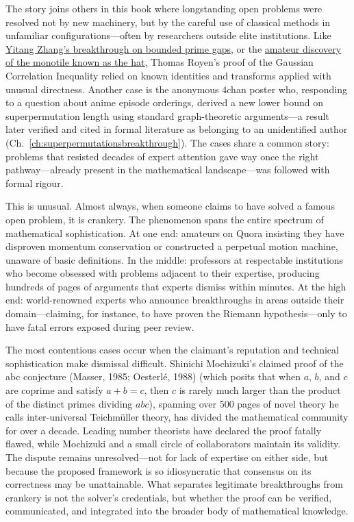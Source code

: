 \begin{commentary}
The story joins others in this book where longstanding open problems were resolved not by new machinery, but by the careful use of classical methods in unfamiliar configurations—often by researchers outside elite institutions. Like \hyperref[ch:boundedprimegaps]{Yitang Zhang's breakthrough on bounded prime gaps}, or the \hyperref[ch:hatmonotile]{amateur discovery of the monotile known as the \QSOpen{}hat,\QSClose{}} Thomas Royen's proof of the Gaussian Correlation Inequality relied on known identities and transforms applied with unusual directness. Another case is the anonymous 4chan poster who, responding to a question about anime episode orderings, derived a new lower bound on superpermutation length using standard graph-theoretic arguments—a result later verified and cited in formal literature as belonging to an unidentified author (Ch.~\ref{ch:superpermutationsbreakthrough}). The cases share a common story: problems that resisted decades of expert attention gave way once the right pathway—already present in the mathematical landscape—was followed with formal rigour.

This is unusual. Almost always, when someone claims to have solved a famous open problem, it is crankery. The phenomenon spans the entire spectrum of mathematical sophistication. At one end: amateurs on Quora insisting they have disproven momentum conservation or constructed a perpetual motion machine, unaware of basic definitions. In the middle: professors at respectable institutions who become obsessed with problems adjacent to their expertise, producing hundreds of pages of arguments that experts dismiss within minutes. At the high end: world-renowned experts who announce breakthroughs in areas outside their domain—claiming, for instance, to have proven the Riemann hypothesis—only to have fatal errors exposed during peer review.

The most contentious cases occur when the claimant's reputation and technical sophistication make dismissal difficult. Shinichi Mochizuki's claimed proof of the abc conjecture (Masser, 1985; Oesterlé, 1988) (which posits that when $a$, $b$, and $c$ are coprime and satisfy $a+b=c$, then $c$ is rarely much larger than the product of the distinct primes dividing $abc$), spanning over 500 pages of novel theory he calls \QSOpen{}inter-universal Teichmüller theory,\QSClose{} has divided the mathematical community for over a decade. Leading number theorists have declared the proof fatally flawed, while Mochizuki and a small circle of collaborators maintain its validity. The dispute remains unresolved—not for lack of expertise on either side, but because the proposed framework is so idiosyncratic that consensus on its correctness may be unattainable. What separates legitimate breakthroughs from crankery is not the solver's credentials, but whether the proof can be verified, communicated, and integrated into the broader body of mathematical knowledge.
\end{commentary}

